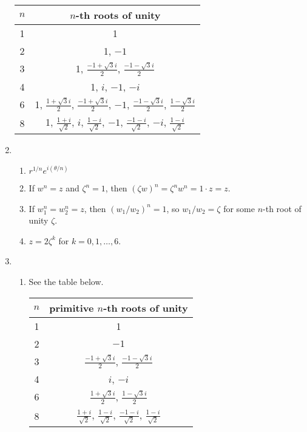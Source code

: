 \begin{enumerate}
\begin{center}
\begingroup
\setlength{\tabcolsep}{10pt}
\renewcommand{\arraystretch}{1.5}
\begin{tabular}{|c|c|} \hline
$n$ & $n$-th roots of unity \\ \hline
1 & 1 \\ \hline
2 & 1, $-1$ \\ \hline
3 & 1, $\frac{-1 + \sqrt{3}i}{2}$, $\frac{-1 - \sqrt{3}i}{2}$ \\ \hline
4 & 1, $i$, $-1$, $-i$ \\ \hline
6 & 1, $\frac{1 + \sqrt{3}i}{2}$, $\frac{-1 + \sqrt{3}i}{2}$, $-1$, $\frac{-1 - \sqrt{3}i}{2}$, $\frac{1 - \sqrt{3}i}{2}$ \\ \hline
8 & 1, $\frac{1 + i}{\sqrt{2}}$, $i$, $\frac{1 - i}{\sqrt{2}}$, $-1$, $\frac{-1 - i}{\sqrt{2}}$, $-i$, $\frac{1 - i}{\sqrt{2}}$ \\ \hline
\end{tabular}
\endgroup
\end{center}
\item \begin{enumerate}
\item $r^{1/n}e^{i(\theta/n)}$
\item If $w^n = z$ and $\zeta^n = 1$, then $(\zeta w)^n = \zeta^nw^n = 1\cdot z = z$.
\item If $w_1^n = w_2^n = z$, then $(w_1/w_2)^n = 1$, so $w_1/w_2 = \zeta$ for some $n$-th root of unity $\zeta$.
\item $z = 2\zeta^k$ for $k = 0, 1, \ldots, 6$.
\end{enumerate}
\item \begin{enumerate}
\item See the table below.
\begin{center}
\begingroup
\setlength{\tabcolsep}{10pt}
\renewcommand{\arraystretch}{1.5}
\begin{tabular}{|c|c|} \hline
$n$ & primitive $n$-th roots of unity \\ \hline
1 & 1 \\ \hline
2 & $-1$ \\ \hline
3 & $\frac{-1 + \sqrt{3}i}{2}$, $\frac{-1 - \sqrt{3}i}{2}$ \\ \hline
4 & $i$, $-i$ \\ \hline
6 & $\frac{1 + \sqrt{3}i}{2}$, $\frac{1 - \sqrt{3}i}{2}$ \\ \hline
8 & $\frac{1 + i}{\sqrt{2}}$, $\frac{1 - i}{\sqrt{2}}$, $\frac{-1 - i}{\sqrt{2}}$, $\frac{1 - i}{\sqrt{2}}$ \\ \hline

\end{tabular}
\end{center}
\end{enumerate}
\end{enumerate}
